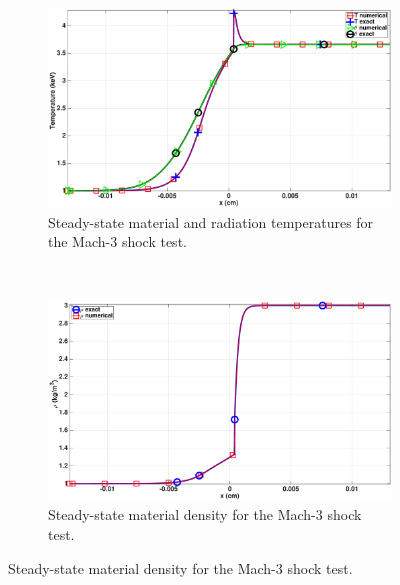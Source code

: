 \documentclass[times,doublespace]{fldauth}%
\begin{document}
%
\begin{figure}[H]
    \begin{subfigure}{0.5\textwidth}
    \centering
    \includegraphics[width=\linewidth]{figures/cst-xs/mach_3_cst_xs_nel_1000_temperature.eps}
    \caption{Steady-state material and radiation temperatures for the Mach-3 shock test.}\label{fig:mach-3-cst-xs-temp}
    \end{subfigure}
    ~
    \begin{subfigure}{0.5\textwidth}
    \centering
    \includegraphics[width=\linewidth]{figures/cst-xs/mach_3_cst_xs_nel_1000_density.eps}
    \caption{Steady-state material density for the Mach-3 shock test.}\label{fig:mach-3-cst-xs-dens}
    \end{subfigure}
    

\end{figure}
\end{document}
